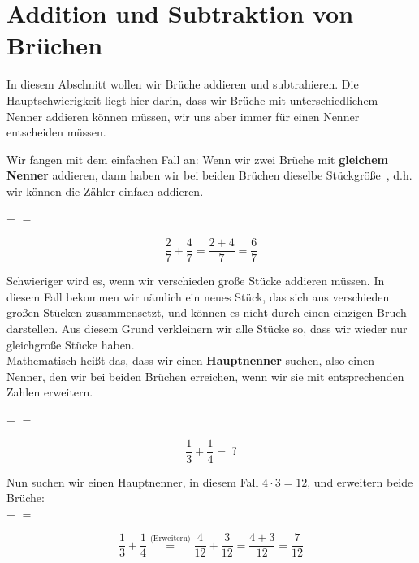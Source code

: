 \documentclass[../../main]{subfiles}
\begin{document}
\section{Addition und Subtraktion von Brüchen}
In diesem Abschnitt wollen wir Brüche addieren und subtrahieren. Die Hauptschwierigkeit liegt hier darin, dass wir Brüche mit unterschiedlichem Nenner addieren können müssen, wir uns aber immer für einen Nenner entscheiden müssen.

Wir fangen mit dem einfachen Fall an: Wenn wir zwei Brüche mit \textbf{gleichem Nenner} addieren, dann haben wir bei beiden Brüchen dieselbe \glqq Stückgröße\grqq~, d.h. wir können die Zähler einfach addieren.
\begin{example}{}
$+$
$=$

\[\frac{2}{7}+\frac{4}{7} = \frac{2+4}{7}=\frac{6}{7}\]
\end{example}

Schwieriger wird es, wenn wir verschieden große Stücke addieren müssen. In diesem Fall bekommen wir nämlich ein neues Stück, das sich aus verschieden großen Stücken zusammensetzt, und können es nicht durch einen einzigen Bruch darstellen. Aus diesem Grund verkleinern wir alle Stücke so, dass wir wieder nur gleichgroße Stücke haben.\\
Mathematisch heißt das, dass wir einen \textbf{Hauptnenner} suchen, also einen Nenner, den wir bei beiden Brüchen erreichen, wenn wir sie mit entsprechenden Zahlen erweitern.
\begin{example}{}
$+$
$=$

\[\frac{1}{3}+\frac{1}{4}=~?\]

Nun suchen wir einen Hauptnenner, in diesem Fall $4\cdot 3=12$, und erweitern beide Brüche:\\

$+$
$=$

\[\frac{1}{3}+\frac{1}{4}\ensuremath{\stackrel{\text{(Erweitern)}}{=}}\frac{4}{12}+\frac{3}{12}=\frac{4+3}{12}=\frac{7}{12}\]
\end{example}
\end{document}
